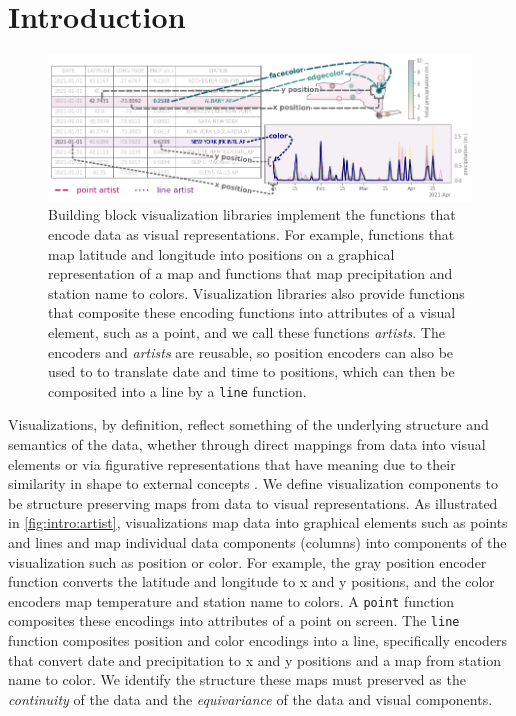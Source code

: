 \documentclass[../main.tex]{subfiles}
\begin{document}
\section{Introduction}
\label{sec:intro}
\begin{figure}[h]
    \includegraphics[width=1\textwidth]{figures/intro/functions.png}
    \caption{Building block visualization libraries implement the functions that encode data as visual representations. For example, functions that map latitude and longitude into positions on a graphical representation of a map and functions that map precipitation and station name to colors. Visualization libraries also provide functions that composite these encoding functions into attributes of a visual element, such as a point, and we call these functions \textit{artists}.  The encoders and \textit{artists} are reusable, so position encoders can also be used to to translate date and time to positions, which can then be composited into a line by a \texttt{line} function. 
    }
    \label{fig:intro:artist}
\end{figure}

Visualizations, by definition, reflect something of the underlying structure and semantics\cite{friendlyBriefHistoryData2008} of the data, whether through direct mappings from data into visual elements or via figurative representations that have meaning due to their similarity in shape to external concepts \cite{byrneAcquiredCodesMeaning2016}. We define visualization components to be structure preserving maps from data to visual representations. As illustrated in \autoref{fig:intro:artist}, visualizations map data into graphical elements such as points and lines and map individual data components (columns) into components of the visualization such as position or color. For example, the gray position encoder function converts the latitude and longitude to x and y positions, and the color encoders map temperature and station name to colors. A \texttt{point} function composites these encodings into attributes of a point on screen. The \texttt{line} function composites position and color encodings into a line, specifically encoders that convert date and precipitation to x and y positions and a map from station name to color. We identify the structure these maps must preserved as the \textit{continuity} of the data and the \textit{equivariance} of the data and visual components. 
\end{document}
